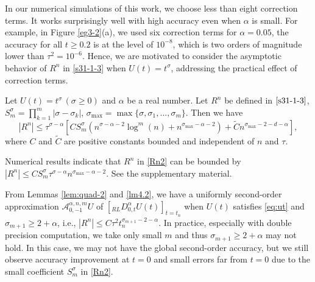 \documentclass[10pt]{siamltex}
\newcommand{\abs}[1]{\left\vert#1\right\vert}
\begin{document}
In our numerical simulations of this work, we choose less than eight correction terms. It  works surprisingly   well with high accuracy  even when $\alpha$ is small. For example, in Figure  \ref{eg3-2}(a), we used six correction terms for $\alpha=0.05$, the accuracy for all $t\geq 0.2$ is at the level of  $10^{-8}$, which is two orders of magnitude lower than $\tau^2=10^{-6}$.
Hence, we are motivated to consider
the asymptotic behavior of $R^n$ in \eqref{s31-1-3} when $U(t)=t^{\sigma}$, addressing the practical effect of correction terms.
\begin{lemma}\label{lem:quad-2}
Let $U(t)=t^{\sigma}\,(\sigma\geq0)$ and $\alpha$ be a real number. Let $R^n$ be defined in  $\eqref{s31-1-3}$, $S_m^{\sigma}=\prod_{k=1}^m|\sigma-\sigma_k|$, $\sigma_{\max}=\max\{\sigma,\sigma_1,...,\sigma_m\}$. Then we have
\begin{equation}\label{Rn2}
 {\abs{R^n}}
\leq  {\tau^{\sigma-\alpha}} \left[CS_m^{\sigma}
\left(n^{\sigma-\alpha-2}\log^{m}(n)+n^{\sigma_{\max}-\alpha-2}\right)
+\widetilde{C}{n}^{\sigma_{\max}-2-d-\alpha}\right],
\end{equation}
where  $C$ and $\widetilde{C}$ are positive constants bounded and independent of $n$ and $\tau$.
\end{lemma}

\begin{remark}
Numerical results indicate that  {$R^n$} in \eqref{Rn2} can be bounded by
$  {|R^n|}\leq CS_m^{\sigma} {\tau^{\sigma-\alpha}}n^{\sigma_{\max}-\alpha-2}.$
See the supplementary material.
\end{remark}

From Lemmas \ref{lem:quad-2} and \ref{lm4.2},  we have a uniformly second-order approximation
$\mathcal{{A}}_{0,-1}^{\alpha,n,m}U$ of $\left[{}_{RL}D_{0,t}^{\alpha}U(t)\right]_{t=t_n}$
when  $U(t)$ satisfies \eqref{eq:ut} and $\sigma_{m+1}\geq 2+\alpha$, i.e.,
$|R^n|\leq C\tau^2t_n^{\sigma_{m+1}-2-\alpha}$.
In practice, especially with double precision computation, we take only small $m$ and thus   $\sigma_{m+1}\geq 2+\alpha$ may not hold.  In this case, we may not have  the global  second-order accuracy, but we still observe accuracy improvement at $t=0$ and  small errors far from $t=0$ due to the small coefficient $S_m^{\sigma}$ in \eqref{Rn2}.
\end{document}
